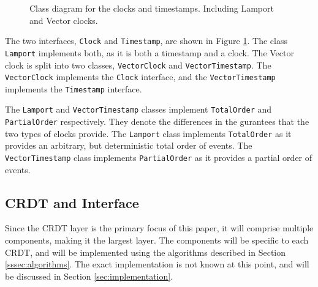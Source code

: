 \documentclass[12pt]{report}
\begin{document}
\begin{figure}[h]
    \centering
    \caption{Class diagram for the clocks and timestamps. Including Lamport and Vector clocks.}
    \label{fig:ordered}
\end{figure} 

The two interfaces, \texttt{Clock} and \texttt{Timestamp}, are shown in Figure \ref{fig:ordered}. The class \texttt{Lamport} implements both, as it is both a timestamp and a clock. The Vector clock is split into two classes, \texttt{VectorClock} and \texttt{VectorTimestamp}. The \texttt{VectorClock} implements the \texttt{Clock} interface, and the \texttt{VectorTimestamp} implements the \texttt{Timestamp} interface. \par

The \texttt{Lamport} and \texttt{VectorTimestamp} classes implement \texttt{TotalOrder} and \texttt{PartialOrder} respectively. They denote the differences in the gurantees that the two types of clocks provide. The \texttt{Lamport} class implements \texttt{TotalOrder} as it provides an arbitrary, but deterministic total order of events. The \texttt{VectorTimestamp} class implements \texttt{PartialOrder} as it provides a partial order of events. \par

\subsection{CRDT and Interface}
Since the CRDT layer is the primary focus of this paper, it will comprise multiple components, making it the largest layer. The components will be specific to each CRDT, and will be implemented using the algorithms described in Section \ref{sssec:algorithms}. The exact implementation is not known at this point, and will be discussed in Section \ref{sec:implementation}. \par
\end{document}
